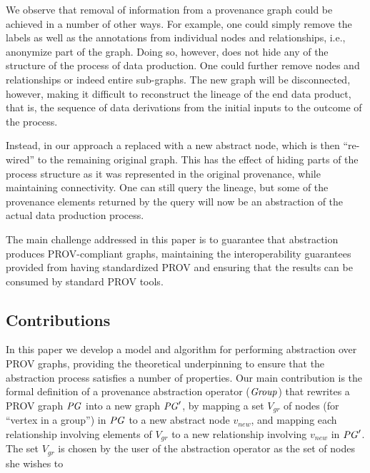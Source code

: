 We observe that removal of information from a provenance graph could be achieved in a number of other ways.
%
For example, one could simply remove the labels as well as the annotations from individual nodes and relationships, i.e., anonymize part of the graph. Doing so, however, does not hide any of the structure of the process of data production. One could further remove nodes and relationships or  indeed entire sub-graphs. The new graph will be disconnected, however, making it difficult to reconstruct the lineage of the end data product, that is, the sequence of data derivations from the initial inputs to the outcome of the process.

Instead, in our approach a  replaced with a new abstract node, which is then ``re-wired'' to the remaining original graph. This has the effect of hiding parts of the process structure as it was represented in the original provenance, while maintaining connectivity. One can still query the lineage, but some of the provenance elements returned by the query will now be an abstraction of the actual data production process.

The main challenge addressed in this paper is to guarantee that abstraction produces PROV-compliant  graphs,   maintaining the interoperability guarantees provided from having standardized PROV and ensuring that the results can be consumed by standard PROV tools. %


\subsection{Contributions} \label{sec:contributions}

In this paper we develop a model and algorithm for performing  abstraction over PROV graphs, providing the theoretical underpinning to ensure that the abstraction process satisfies a number of properties.
%
Our main contribution is the formal  definition of a provenance abstraction operator ($\mathit{Group}$) that  rewrites  a PROV graph $\mathit{PG}$ into a new graph $\mathit{PG}'$, by  mapping a set $V_{gr}$ of nodes (for ``vertex in a group'') in $\mathit{PG}$ to a new abstract node $v_{new}$, and  mapping each relationship involving elements of $V_{gr}$  to a new relationship involving $v_{new}$ in $\mathit{PG}'$. 
The set $V_{gr}$ is chosen by the user of the abstraction operator as the set of nodes she wishes to 


